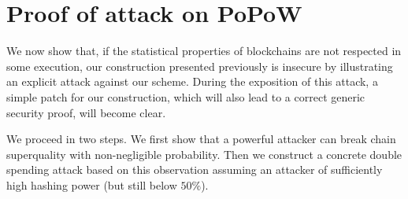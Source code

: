\section{Proof of attack on PoPoW}
\label{sec:attack-full}

We now show that, if the statistical properties of blockchains are not respected
in some execution, our construction presented previously is insecure by
illustrating an explicit attack against our scheme.
During the
exposition of this attack, a simple patch for our construction, which will also
lead to a correct generic security proof, will become clear.

We proceed in two steps. We
first show that a powerful attacker can break chain superquality with
non-negligible probability. Then we construct a concrete double spending attack
based on this observation assuming an attacker of sufficiently high hashing
power (but still below $50\%$).

